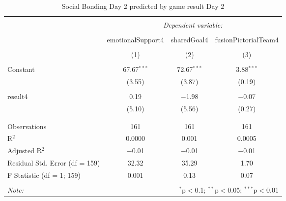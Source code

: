 
\begin{table}[!htbp] \centering 
  \caption{Social Bonding Day 2 predicted by game result Day 2} 
  \label{tab:socialBondingDay2Result} 
\footnotesize 
\begin{tabular}{@{\extracolsep{5pt}}lccc} 
\\[-1.8ex]\hline 
\hline \\[-1.8ex] 
 & \multicolumn{3}{c}{\textit{Dependent variable:}} \\ 
\cline{2-4} 
\\[-1.8ex] & emotionalSupport4 & sharedGoal4 & fusionPictorialTeam4 \\ 
\\[-1.8ex] & (1) & (2) & (3)\\ 
\hline \\[-1.8ex] 
 Constant & 67.67$^{***}$ & 72.67$^{***}$ & 3.88$^{***}$ \\ 
  & (3.55) & (3.87) & (0.19) \\ 
  & & & \\ 
 result4 & 0.19 & $-$1.98 & $-$0.07 \\ 
  & (5.10) & (5.56) & (0.27) \\ 
  & & & \\ 
\hline \\[-1.8ex] 
Observations & 161 & 161 & 161 \\ 
R$^{2}$ & 0.0000 & 0.001 & 0.0005 \\ 
Adjusted R$^{2}$ & $-$0.01 & $-$0.01 & $-$0.01 \\ 
Residual Std. Error (df = 159) & 32.32 & 35.29 & 1.70 \\ 
F Statistic (df = 1; 159) & 0.001 & 0.13 & 0.07 \\ 
\hline 
\hline \\[-1.8ex] 
\textit{Note:}  & \multicolumn{3}{r}{$^{*}$p$<$0.1; $^{**}$p$<$0.05; $^{***}$p$<$0.01} \\ 
\end{tabular} 
\end{table} 
